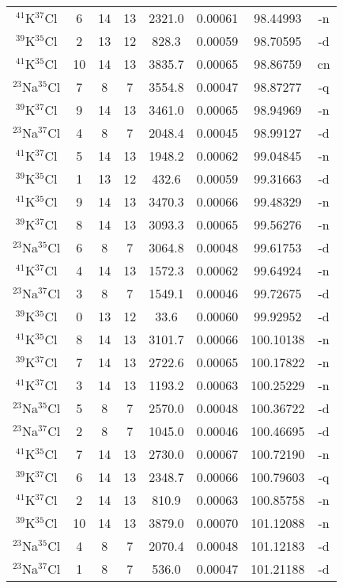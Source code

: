 \begin{table*}[htp]
\begin{tabular}{cccccccc}
$^{41}$K$^{37}$Cl & 6 & 14 & 13 & 2321.0 & 0.00061 & 98.44993 & -n \\
$^{39}$K$^{35}$Cl & 2 & 13 & 12 & 828.3 & 0.00059 & 98.70595 & -d \\
$^{41}$K$^{35}$Cl & 10 & 14 & 13 & 3835.7 & 0.00065 & 98.86759 & cn \\
$^{23}$Na$^{35}$Cl & 7 & 8 & 7 & 3554.8 & 0.00047 & 98.87277 & -q \\
$^{39}$K$^{37}$Cl & 9 & 14 & 13 & 3461.0 & 0.00065 & 98.94969 & -n \\
$^{23}$Na$^{37}$Cl & 4 & 8 & 7 & 2048.4 & 0.00045 & 98.99127 & -d \\
$^{41}$K$^{37}$Cl & 5 & 14 & 13 & 1948.2 & 0.00062 & 99.04845 & -n \\
$^{39}$K$^{35}$Cl & 1 & 13 & 12 & 432.6 & 0.00059 & 99.31663 & -d \\
$^{41}$K$^{35}$Cl & 9 & 14 & 13 & 3470.3 & 0.00066 & 99.48329 & -n \\
$^{39}$K$^{37}$Cl & 8 & 14 & 13 & 3093.3 & 0.00065 & 99.56276 & -n \\
$^{23}$Na$^{35}$Cl & 6 & 8 & 7 & 3064.8 & 0.00048 & 99.61753 & -d \\
$^{41}$K$^{37}$Cl & 4 & 14 & 13 & 1572.3 & 0.00062 & 99.64924 & -n \\
$^{23}$Na$^{37}$Cl & 3 & 8 & 7 & 1549.1 & 0.00046 & 99.72675 & -d \\
$^{39}$K$^{35}$Cl & 0 & 13 & 12 & 33.6 & 0.00060 & 99.92952 & -d \\
$^{41}$K$^{35}$Cl & 8 & 14 & 13 & 3101.7 & 0.00066 & 100.10138 & -n \\
$^{39}$K$^{37}$Cl & 7 & 14 & 13 & 2722.6 & 0.00065 & 100.17822 & -n \\
$^{41}$K$^{37}$Cl & 3 & 14 & 13 & 1193.2 & 0.00063 & 100.25229 & -n \\
$^{23}$Na$^{35}$Cl & 5 & 8 & 7 & 2570.0 & 0.00048 & 100.36722 & -d \\
$^{23}$Na$^{37}$Cl & 2 & 8 & 7 & 1045.0 & 0.00046 & 100.46695 & -d \\
$^{41}$K$^{35}$Cl & 7 & 14 & 13 & 2730.0 & 0.00067 & 100.72190 & -n \\
$^{39}$K$^{37}$Cl & 6 & 14 & 13 & 2348.7 & 0.00066 & 100.79603 & -q \\
$^{41}$K$^{37}$Cl & 2 & 14 & 13 & 810.9 & 0.00063 & 100.85758 & -n \\
$^{39}$K$^{35}$Cl & 10 & 14 & 13 & 3879.0 & 0.00070 & 101.12088 & -n \\
$^{23}$Na$^{35}$Cl & 4 & 8 & 7 & 2070.4 & 0.00048 & 101.12183 & -d \\
$^{23}$Na$^{37}$Cl & 1 & 8 & 7 & 536.0 & 0.00047 & 101.21188 & -d \\
\hline
\end{tabular}

\par 
\end{table*}
